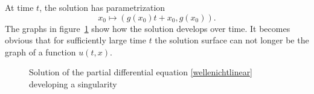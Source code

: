 At time $t$, the solution has parametrization
\[
x_0\mapsto (g(x_0)t+x_0,g(x_0)).
\]
The graphs in figure~\ref{g} show how the solution develops over time.
It becomes obvious that for sufficiently large time $t$ the solution
surface can not longer be the graph of a function $u(t,x)$.

\begin{figure}
\centering
{}
\caption{Solution of the partial differential equation
\eqref{wellenichtlinear} developing a singularity \label{g}}
\end{figure}

